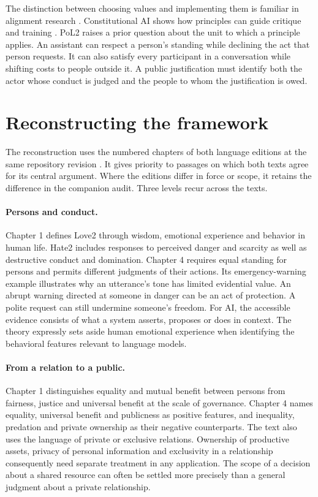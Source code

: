 \documentclass[11pt]{article}
\begin{document}
The distinction between choosing values and implementing them is familiar in alignment research \cite{gabriel}. Constitutional AI shows how principles can guide critique and training \cite{bai}. PoL2 raises a prior question about the unit to which a principle applies. An assistant can respect a person's standing while declining the act that person requests. It can also satisfy every participant in a conversation while shifting costs to people outside it. A public justification must identify both the actor whose conduct is judged and the people to whom the justification is owed.

\section{Reconstructing the framework}
The reconstruction uses the numbered chapters of both language editions at the same repository revision \cite{source}. It gives priority to passages on which both texts agree for its central argument. Where the editions differ in force or scope, it retains the difference in the companion audit. Three levels recur across the texts.

\paragraph{Persons and conduct.} Chapter 1 defines Love2 through wisdom, emotional experience and behavior in human life. Hate2 includes responses to perceived danger and scarcity as well as destructive conduct and domination. Chapter 4 requires equal standing for persons and permits different judgments of their actions. Its emergency-warning example illustrates why an utterance's tone has limited evidential value. An abrupt warning directed at someone in danger can be an act of protection. A polite request can still undermine someone's freedom. For AI, the accessible evidence consists of what a system asserts, proposes or does in context. The theory expressly sets aside human emotional experience when identifying the behavioral features relevant to language models.

\paragraph{From a relation to a public.} Chapter 1 distinguishes equality and mutual benefit between persons from fairness, justice and universal benefit at the scale of governance. Chapter 4 names equality, universal benefit and publicness as positive features, and inequality, predation and private ownership as their negative counterparts. The text also uses the language of private or exclusive relations. Ownership of productive assets, privacy of personal information and exclusivity in a relationship consequently need separate treatment in any application. The scope of a decision about a shared resource can often be settled more precisely than a general judgment about a private relationship.
\end{document}
